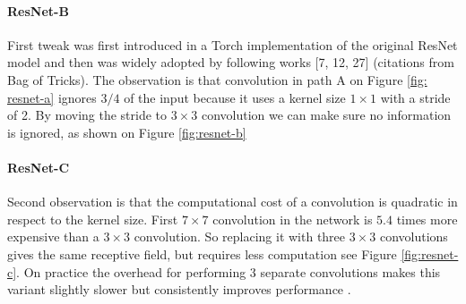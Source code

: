 \paragraph{ResNet-B}
First tweak was first introduced in a Torch implementation of the original ResNet model and then was widely adopted by following works [7, 12, 27] (citations from Bag of Tricks). The observation is that convolution in path A on Figure \ref{fig: resnet-a} ignores $3/4$ of the input because it uses a kernel size $1 \times 1$ with a stride of 2. By moving the stride to $3 \times 3$ convolution we can make sure no information is ignored, as shown on Figure \ref{fig:resnet-b}



\paragraph{ResNet-C}
Second observation is that the computational cost of a convolution is quadratic in respect to the kernel size. First $7 \times 7$ convolution in the network is $5.4$ times more expensive than a $3 \times 3 $ convolution. So replacing it with three $3 \times 3 $ convolutions gives the same receptive field, but requires less computation see Figure \ref{fig:resnet-c}. On practice the overhead for performing 3 separate convolutions makes this variant slightly slower but consistently improves performance \cite{he2019_bag_of_tricks}. 



